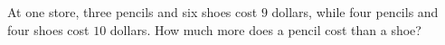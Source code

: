 At one store, three pencils and six shoes cost $9$ dollars, while four pencils and four shoes cost $10$ dollars. How much more does a pencil cost than a shoe?
